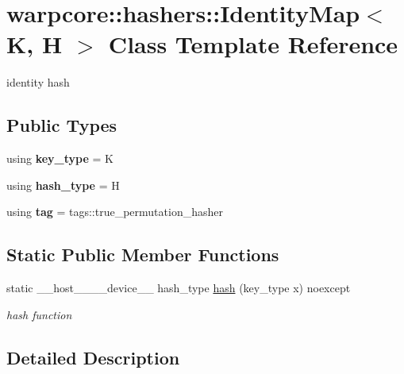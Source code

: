 \hypertarget{classwarpcore_1_1hashers_1_1IdentityMap}{}\section{warpcore\+:\+:hashers\+:\+:Identity\+Map$<$ K, H $>$ Class Template Reference}
\label{classwarpcore_1_1hashers_1_1IdentityMap}


identity hash  


\subsection*{Public Types}
\begin{DoxyCompactItemize}
\item 
\mbox{\label{classwarpcore_1_1hashers_1_1IdentityMap_a99abe762a8cc3c40680331746e5c1e2f}} 
using {\bfseries key\+\_\+type} = K
\item 
\mbox{\label{classwarpcore_1_1hashers_1_1IdentityMap_a1b978a855ad6bbb1e3716fcd96d5f070}} 
using {\bfseries hash\+\_\+type} = H
\item 
\mbox{\label{classwarpcore_1_1hashers_1_1IdentityMap_a422f907dc8e34c315da5bdfe9297f03b}} 
using {\bfseries tag} = tags\+::true\+\_\+permutation\+\_\+hasher
\end{DoxyCompactItemize}
\subsection*{Static Public Member Functions}
\begin{DoxyCompactItemize}
\item 
static \+\_\+\+\_\+host\+\_\+\+\_\+\+\_\+\+\_\+device\+\_\+\+\_\+ hash\+\_\+type \hyperlink{classwarpcore_1_1hashers_1_1IdentityMap_a916ddad468ba57f3ce81e74c1ef8e57a}{hash} (key\+\_\+type x) noexcept
\begin{DoxyCompactList}\small\item\em hash function \end{DoxyCompactList}\end{DoxyCompactItemize}


\subsection{Detailed Description}
